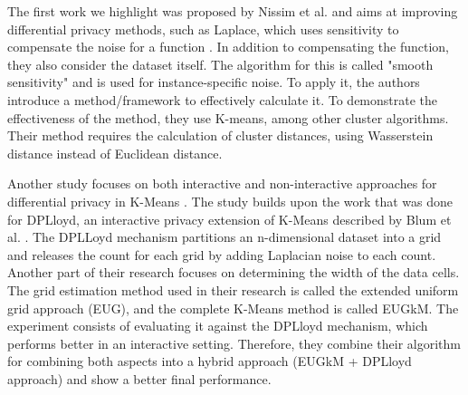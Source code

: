The first work we highlight was proposed by Nissim et al. and aims at improving differential privacy methods, such as Laplace, which uses sensitivity to compensate the noise for a function \citep{nissim_smooth_2007}.
In addition to compensating the function, they also consider the dataset itself.
The algorithm for this is called "smooth sensitivity" and is used for instance-specific noise.
To apply it, the authors introduce a method/framework to effectively calculate it.
To demonstrate the effectiveness of the method, they use K-means, among other cluster algorithms.
Their method requires the calculation of cluster distances, using Wasserstein distance instead of Euclidean distance.

Another study focuses on both interactive and non-interactive approaches for differential privacy in K-Means \citep{su_differentially_2015-1}.
The study builds upon the work that was done for DPLloyd, an interactive privacy extension of K-Means described by Blum et al. \citep{blum_practical_2005}.
The DPLLoyd mechanism partitions an n-dimensional dataset into a grid and releases the count for each grid by adding Laplacian noise to each count.
Another part of their research focuses on determining the width of the data cells.
The grid estimation method used in their research is called the extended uniform grid approach (EUG), and the complete K-Means method is called EUGkM.
The experiment consists of evaluating it against the DPLloyd mechanism, which performs better in an interactive setting.
Therefore, they combine their algorithm for combining both aspects into a hybrid approach (EUGkM + DPLloyd approach) and show a better final performance.

